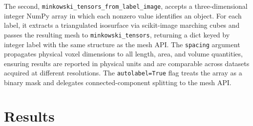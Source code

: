 \documentclass[times, twoside, watermark]{zHenriquesLab-StyleBioRxiv}
\begin{document}
The second, \texttt{minkowski\_tensors\_from\_label\_image}, accepts a three-dimensional integer NumPy array in which each nonzero value identifies an object.
For each label, it extracts a triangulated isosurface via scikit-image marching cubes and passes the resulting mesh to \texttt{minkowski\_tensors}, returning a dict keyed by integer label with the same structure as the mesh API.
The \texttt{spacing} argument propagates physical voxel dimensions to all length, area, and volume quantities, ensuring results are reported in physical units and are comparable across datasets acquired at different resolutions.
The \texttt{autolabel=True} flag treats the array as a binary mask and delegates connected-component splitting to the mesh API.


\section*{Results}
\end{document}
